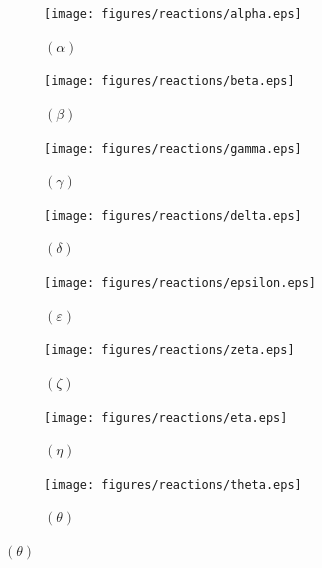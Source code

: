 \begin{figure}[H]
    \captionsetup[subfigure]{labelformat=empty}
    \centering
    \begin{subfigure}[t]{0.25\textwidth}
        \centering
        \texttt{[image: figures/reactions/alpha.eps]}
        \caption{$(\alpha)$}
    \end{subfigure}%
    \begin{subfigure}[t]{0.25\textwidth}
        \centering
        \texttt{[image: figures/reactions/beta.eps]}
        \caption{$(\beta)$}
    \end{subfigure}%
    \begin{subfigure}[t]{0.25\textwidth}
        \centering
        \texttt{[image: figures/reactions/gamma.eps]}
        \caption{$(\gamma)$}
    \end{subfigure}%
    \begin{subfigure}[t]{0.25\textwidth}
        \centering
        \texttt{[image: figures/reactions/delta.eps]}
        \caption{$(\delta)$}
    \end{subfigure}%

    \begin{subfigure}[t]{0.25\textwidth}
        \centering
        \texttt{[image: figures/reactions/epsilon.eps]}
        \caption{$(\varepsilon)$}
    \end{subfigure}%
    \begin{subfigure}[t]{0.25\textwidth}
        \centering
        \texttt{[image: figures/reactions/zeta.eps]}
        \caption{$(\zeta)$}
    \end{subfigure}%
    \begin{subfigure}[t]{0.25\textwidth}
        \centering
        \texttt{[image: figures/reactions/eta.eps]}
        \caption{$(\eta)$}
    \end{subfigure}%
    \begin{subfigure}[t]{0.25\textwidth}
        \centering
        \texttt{[image: figures/reactions/theta.eps]}
        \caption{$(\theta)$}
    \end{subfigure}%


\end{figure}
